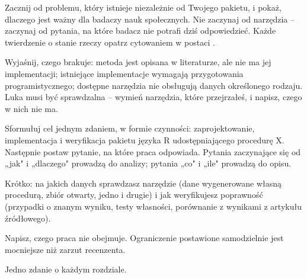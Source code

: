 \wprowadzenie


 Zacznij od problemu, który istnieje niezależnie od Twojego pakietu, i pokaż, dlaczego jest ważny dla badaczy nauk społecznych. Nie zaczynaj od narzędzia – zaczynaj od pytania, na które badacz nie potrafi dziś odpowiedzieć. Każde twierdzenie o stanie rzeczy opatrz cytowaniem w postaci .

 Wyjaśnij, czego brakuje: metoda jest opisana w literaturze, ale nie ma jej implementacji; istniejące implementacje wymagają przygotowania programistycznego; dostępne narzędzia nie obsługują danych określonego rodzaju. Luka musi być sprawdzalna – wymień narzędzia, które przejrzałeś, i napisz, czego w nich nie ma.

 Sformułuj cel jednym zdaniem, w formie czynności: zaprojektowanie, implementacja i weryfikacja pakietu języka R udostępniającego procedurę X. Następnie postaw pytanie, na które praca odpowiada. Pytania zaczynające się od „jak" i „dlaczego" prowadzą do analizy; pytania „co" i „ile" prowadzą do opisu.

 Krótko: na jakich danych sprawdzasz narzędzie (dane wygenerowane własną procedurą, zbiór otwarty, jedno i drugie) i jak weryfikujesz poprawność (przypadki o znanym wyniku, testy własności, porównanie z wynikami z artykułu źródłowego).

 Napisz, czego praca nie obejmuje. Ograniczenie postawione samodzielnie jest mocniejsze niż zarzut recenzenta.

 Jedno zdanie o każdym rozdziale.

%
